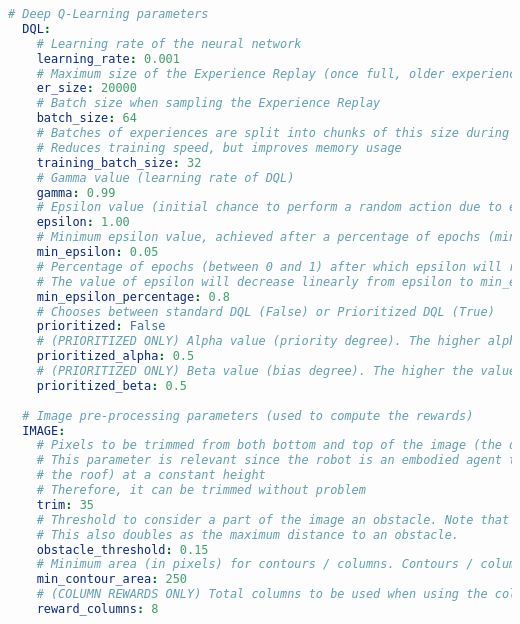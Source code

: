 \begin{lstlisting}[language=yaml]
  # Deep Q-Learning parameters
  DQL:
    # Learning rate of the neural network
    learning_rate: 0.001
    # Maximum size of the Experience Replay (once full, older experiences will be removed)
    er_size: 20000
    # Batch size when sampling the Experience Replay
    batch_size: 64
    # Batches of experiences are split into chunks of this size during training
    # Reduces training speed, but improves memory usage
    training_batch_size: 32
    # Gamma value (learning rate of DQL)
    gamma: 0.99
    # Epsilon value (initial chance to perform a random action due to exploration-exploitation)
    epsilon: 1.00
    # Minimum epsilon value, achieved after a percentage of epochs (min_epsilon_percentage)
    min_epsilon: 0.05
    # Percentage of epochs (between 0 and 1) after which epsilon will reach min_epsilon.
    # The value of epsilon will decrease linearly from epsilon to min_epsilon
    min_epsilon_percentage: 0.8
    # Chooses between standard DQL (False) or Prioritized DQL (True)
    prioritized: False
    # (PRIORITIZED ONLY) Alpha value (priority degree). The higher alpha is, the higher the probability of choosing higher error experiences is
    prioritized_alpha: 0.5
    # (PRIORITIZED ONLY) Beta value (bias degree). The higher the value is, the less weight variations have (to avoid big oscillations)
    prioritized_beta: 0.5
  
  # Image pre-processing parameters (used to compute the rewards)
  IMAGE:
    # Pixels to be trimmed from both bottom and top of the image (the depth view seen by the camera)
    # This parameter is relevant since the robot is an embodied agent that will always see the floor (and, in the case of houses,
    # the roof) at a constant height
    # Therefore, it can be trimmed without problem
    trim: 35
    # Threshold to consider a part of the image an obstacle. Note that the image is a grayscale image from 0.0 to 1.0, where 0 (black) means the closest and 1.0 (white) means the furthest
    # This also doubles as the maximum distance to an obstacle.
    obstacle_threshold: 0.15
    # Minimum area (in pixels) for contours / columns. Contours / columns smaller than this size will be ignored
    min_contour_area: 250
    # (COLUMN REWARDS ONLY) Total columns to be used when using the column reward method. Ignored when using the contour reward_method
    reward_columns: 8
    

\end{lstlisting}
